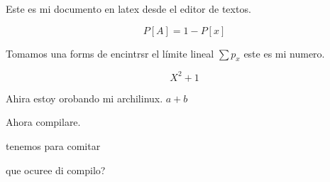 \documentclass{article}
\begin{document}
Este es mi documento en latex desde el editor de textos. 

\begin{displaymath} 
 P[A] = 1 - P[x] 
\end{displaymath} 

 Tomamos una forms de encintrsr el límite lineal
 $ \sum p_x $  este es mi numero.
 
 \begin{displaymath}
    X^2 + 1
 \end{displaymath}
 
 Ahira estoy orobando mi archilinux. $a +b $ 
 
 Ahora compilare. 
 
 
 tenemos para comitar
 
 
 que ocuree di compilo?
\end{document}
